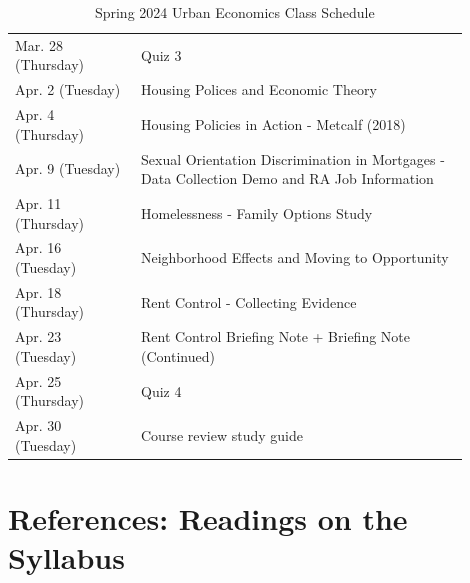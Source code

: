 \documentclass[11pt,letterpaper,final]{article}
\begin{document}
\begin{table}[H]
\begin{tabular}{@{}p{0.25\linewidth}p{0.65\linewidth}@{}}
Mar. 28 (Thursday) & Quiz 3 \\
Apr. 2 (Tuesday) & Housing Polices and Economic Theory \\
Apr. 4 (Thursday) & Housing Policies in Action - Metcalf (2018) \\
Apr. 9 (Tuesday) & Sexual Orientation Discrimination in Mortgages - Data Collection Demo and RA Job Information \\
Apr. 11 (Thursday) & Homelessness - Family Options Study \\
Apr. 16 (Tuesday) & Neighborhood Effects and Moving to Opportunity \\
Apr. 18 (Thursday) & Rent Control - Collecting Evidence \\
Apr. 23 (Tuesday) & Rent Control Briefing Note + Briefing Note (Continued) \\
Apr. 25 (Thursday) & Quiz 4 \\
Apr. 30 (Tuesday) & Course review study guide \\
\bottomrule
\end{tabular}
\caption{Spring 2024 Urban Economics Class Schedule}
\end{table}
  

\newpage
\section{References: Readings on the Syllabus}
\def\refname{}



\end{document}
